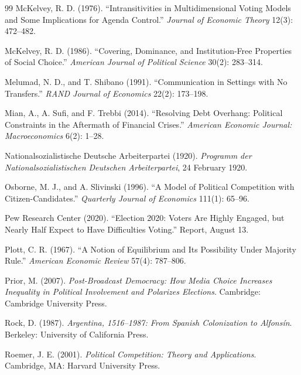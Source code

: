 \documentclass[12pt,letterpaper]{article}
\begin{document}
\begin{thebibliography}{99}
McKelvey, R. D. (1976). ``Intransitivities in Multidimensional Voting Models and Some Implications for Agenda Control.'' \textit{Journal of Economic Theory} 12(3): 472--482.

McKelvey, R. D. (1986). ``Covering, Dominance, and Institution-Free Properties of Social Choice.'' \textit{American Journal of Political Science} 30(2): 283--314.

Melumad, N. D., and T. Shibano (1991). ``Communication in Settings with No Transfers.'' \textit{RAND Journal of Economics} 22(2): 173--198.

Mian, A., A. Sufi, and F. Trebbi (2014). ``Resolving Debt Overhang: Political Constraints in the Aftermath of Financial Crises.'' \textit{American Economic Journal: Macroeconomics} 6(2): 1--28.

Nationalsozialistische Deutsche Arbeiterpartei (1920). \textit{Programm der Nationalsozialistischen Deutschen Arbeiterpartei}, 24 February 1920.

Osborne, M. J., and A. Slivinski (1996). ``A Model of Political Competition with Citizen-Candidates.'' \textit{Quarterly Journal of Economics} 111(1): 65--96.

Pew Research Center (2020). ``Election 2020: Voters Are Highly Engaged, but Nearly Half Expect to Have Difficulties Voting.'' Report, August 13.

Plott, C. R. (1967). ``A Notion of Equilibrium and Its Possibility Under Majority Rule.'' \textit{American Economic Review} 57(4): 787--806.

Prior, M. (2007). \textit{Post-Broadcast Democracy: How Media Choice Increases Inequality in Political Involvement and Polarizes Elections}. Cambridge: Cambridge University Press.

Rock, D. (1987). \textit{Argentina, 1516--1987: From Spanish Colonization to Alfons\'{i}n}. Berkeley: University of California Press.

Roemer, J. E. (2001). \textit{Political Competition: Theory and Applications}. Cambridge, MA: Harvard University Press.


\end{thebibliography}
\end{document}
